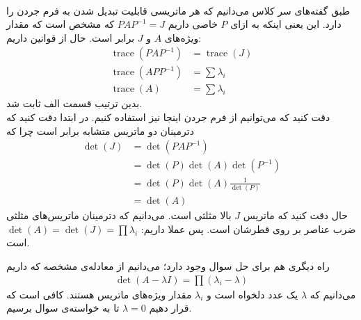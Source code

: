 \\
طبق گفته‌های سر کلاس می‌دانیم که هر ماتریسی قابلیت تبدیل شدن به فرم جردن را دارد. این یعنی اینکه به ازای
$P$
خاصی داریم
$PAP^{-1} = J$
که مشخص است که مقدار ویژه‌های
$A$ و $J$
برابر است. حال از قوانین
داریم:
\begin{align*}
    \operatorname{trace}(PAP^{-1}) &= \operatorname{trace}(J)\\
    \operatorname{trace}(APP^{-1}) &= \sum \lambda_i\\
    \operatorname{trace}(A) &= \sum \lambda_i
\end{align*}
بدین ترتیب قسمت الف ثابت شد.
\\
دقت کنید که می‌‌توانیم از فرم جردن اینجا نیز استفاده کنیم. در ابتدا دقت کنید که دترمینان دو ماتریس متشابه
برابر است چرا که
\begin{align*}
    \det(J) &= \det(PAP^{-1})\\
    &= \det(P)\det(A)\det(P^{-1})\\
    &= \det(P)\det(A) \frac{1}{\det(P)}\\
    &= \det(A)
\end{align*}
حال دقت کنید که ماتریس
$J$
بالا مثلثی است. می‌دانیم که دترمینان ماتریس‌های مثلثی ضرب عناصر بر روی قطرشان است. پس عملا داریم:
$\det(A) = \det(J) = \prod \lambda_i$
است.

\noindent
راه دیگری هم برای حل سوال وجود دارد؛ می‌دانیم از معادله‌ی مشخصه که داریم
\begin{gather*}
    \det(A-\lambda I) = \prod (\lambda_i - \lambda)
\end{gather*}
می‌دانیم که
$\lambda$
یک عدد دلخواه است و
$\lambda_i$
مقدار ویژه‌های ماتریس ‌هستند. کافی است که قرار دهیم
$\lambda = 0$
تا به خواسته‌ی سوال برسیم.



